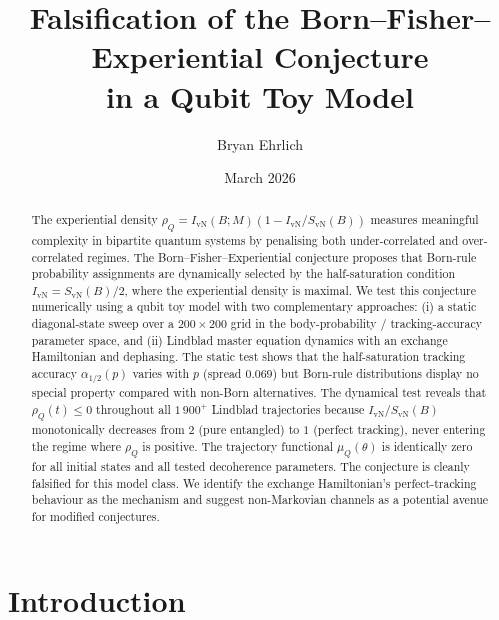 \documentclass[12pt,a4paper]{article}
\newcommand{\SvN}{S_{\mathrm{vN}}}
\newcommand{\IvN}{I_{\mathrm{vN}}}
\newcommand{\rhoQ}{\rho_Q}
\newcommand{\muQ}{\mu_Q}
\begin{document}
\title{Falsification of the Born--Fisher--Experiential Conjecture\\
in a Qubit Toy Model}

\author{Bryan Ehrlich}

\date{March 2026}

\maketitle

\begin{abstract}
The experiential density $\rhoQ = \IvN(B;M)(1 - \IvN/\SvN(B))$
measures meaningful complexity in bipartite quantum systems by
penalising both under-correlated and over-correlated regimes.
The Born--Fisher--Experiential conjecture proposes that Born-rule
probability assignments are dynamically selected by the
half-saturation condition $\IvN = \SvN(B)/2$, where the
experiential density is maximal.
We test this conjecture numerically using a qubit toy model with two
complementary approaches: (i) a static diagonal-state sweep over a
$200 \times 200$ grid in the body-probability / tracking-accuracy
parameter space, and (ii) Lindblad master equation dynamics with an
exchange Hamiltonian and dephasing.
The static test shows that the half-saturation tracking accuracy
$\alpha_{1/2}(p)$ varies with $p$ (spread $0.069$) but Born-rule
distributions display no special property compared with non-Born
alternatives.
The dynamical test reveals that $\rhoQ(t) \le 0$ throughout all
$1\,900^{+}$ Lindblad trajectories because $\IvN/\SvN(B)$
monotonically decreases from $2$ (pure entangled) to $1$ (perfect
tracking), never entering the regime where $\rhoQ$ is positive.
The trajectory functional $\muQ(\theta)$ is identically zero for all
initial states and all tested decoherence parameters.
The conjecture is cleanly falsified for this model class.
We identify the exchange Hamiltonian's perfect-tracking behaviour as
the mechanism and suggest non-Markovian channels as a potential avenue
for modified conjectures.
\end{abstract}

\section{Introduction}\label{sec:intro}
\end{document}
